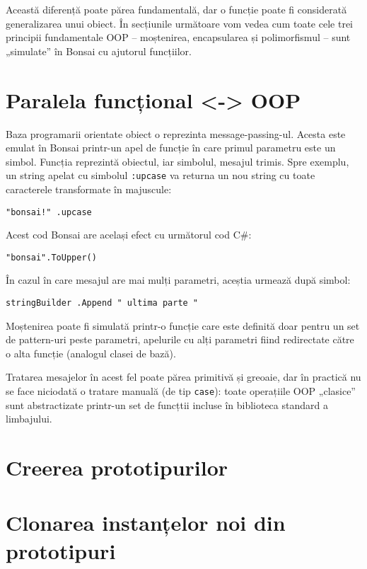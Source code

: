 \documentclass[12pt,a4paper]{memoir}
\begin{document}
Această diferență poate părea fundamentală, dar o funcție poate fi considerată generalizarea unui obiect. În secțiunile următoare vom vedea cum toate cele trei principii fundamentale OOP – moștenirea, encapsularea și polimorfismul – sunt „simulate” în Bonsai cu ajutorul funcțiilor.

\section{Paralela funcțional <-> OOP}

Baza programarii orientate obiect o reprezinta message-passing-ul. Acesta este emulat în Bonsai printr-un apel de funcție în care primul parametru este un simbol. Funcția reprezintă obiectul, iar simbolul, mesajul trimis. Spre exemplu, un string apelat cu simbolul \texttt{:upcase} va returna un nou string cu toate caracterele transformate în majuscule:
\begin{Verbatim}
"bonsai!" .upcase
\end{Verbatim}
Acest cod Bonsai are același efect cu următorul cod C\#:
\begin{Verbatim}
"bonsai".ToUpper()
\end{Verbatim}
În cazul în care mesajul are mai mulți parametri, aceștia urmează după simbol:
\begin{Verbatim}
stringBuilder .Append " ultima parte "
\end{Verbatim}


Moștenirea poate fi simulată printr-o funcție care este definită doar pentru un set de pattern-uri peste parametri, apelurile cu alți parametri fiind redirectate către o alta funcție (analogul clasei de bază).

Tratarea mesajelor în acest fel poate părea primitivă și greoaie, dar în practică nu se face niciodată o tratare manuală (de tip \texttt{case}): toate operațiile OOP „clasice” sunt abstractizate printr-un set de funcțtii incluse în biblioteca standard a limbajului.

\section{Creerea prototipurilor}

\section{Clonarea instanțelor noi din prototipuri}

\end{document}

